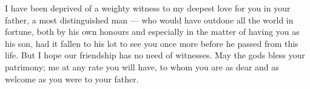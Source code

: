 

 I have been deprived of a weighty witness to my deepest love for you in your father, a most distinguished man --- who would have outdone all the world in fortune, both by his own honours and especially in the matter of having you as his son, had it fallen to his lot to see you once more before he passed from this life. But I hope our friendship has no need of witnesses. May the gods bless your patrimony; me at any rate you will have, to whom you are as dear and as welcome as you were to your father.
